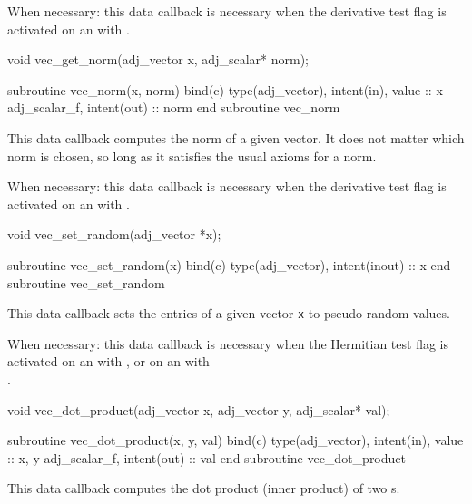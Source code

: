 When necessary: this data callback is necessary when the derivative test flag
is activated on an  with .
\begin{framed}
\begin{minipage}{\columnwidth}
\begin{ccode}
  void vec_get_norm(adj_vector x, adj_scalar* norm);
\end{ccode}
\begin{fortrancode}
  subroutine vec_norm(x, norm) bind(c)
    type(adj_vector), intent(in), value :: x
    adj_scalar_f, intent(out) :: norm
  end subroutine vec_norm
\end{fortrancode}
\end{minipage}
\end{framed}
This data callback computes the norm of a given vector. It does not matter
which norm is chosen, so long as it satisfies the usual axioms for a norm.

When necessary: this data callback is necessary when the derivative test flag
is activated on an  with .

\begin{framed}
\begin{minipage}{\columnwidth}
\begin{ccode}
  void vec_set_random(adj_vector *x);
\end{ccode}
\begin{fortrancode}
  subroutine vec_set_random(x) bind(c)
    type(adj_vector), intent(inout) :: x
  end subroutine vec_set_random
\end{fortrancode}
\end{minipage}
\end{framed}
This data callback sets the entries of a given vector \texttt{x} to pseudo-random values.

When necessary: this data callback is necessary when the Hermitian test flag is
activated on an  with ,
or on an  with \\.

\begin{framed}
\begin{minipage}{\columnwidth}
\begin{ccode}
  void vec_dot_product(adj_vector x, adj_vector y, adj_scalar* val);
\end{ccode}
\begin{fortrancode}
  subroutine vec_dot_product(x, y, val) bind(c)
    type(adj_vector), intent(in), value :: x, y
    adj_scalar_f, intent(out) :: val
  end subroutine vec_dot_product
\end{fortrancode}
\end{minipage}
\end{framed}
This data callback computes the dot product (inner product) of two s.

